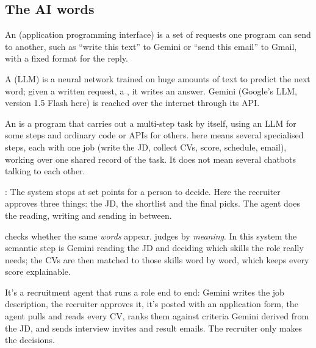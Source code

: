 \subsection*{The AI words}

\begin{definition}[API]
An  (application programming interface) is a set of requests one program can send to another, such as ``write this text'' to Gemini or ``send this email'' to Gmail, with a fixed format for the reply.
\end{definition}

\begin{definition}
A  (LLM) is a neural network trained on huge amounts of text to predict the next word; given a written request, a , it writes an answer. Gemini (Google's LLM, version 1.5 Flash here) is reached over the internet through its API.
\end{definition}

\begin{definition}
An  is a program that carries out a multi-step task by itself, using an LLM for some steps and ordinary code or APIs for others.  here means several specialised steps, each with one job (write the JD, collect CVs, score, schedule, email), working over one shared record of the task. It does not mean several chatbots talking to each other.
\end{definition}

\begin{definition}
: The system stops at set points for a person to decide. Here the recruiter approves three things: the JD, the shortlist and the final picks. The agent does the reading, writing and sending in between.
\end{definition}

\begin{definition}
 checks whether the same \emph{words} appear.  judges by \emph{meaning}. In this system the semantic step is Gemini reading the JD and deciding which skills the role really needs; the CVs are then matched to those skills word by word, which keeps every score explainable.
\end{definition}

\begin{sayit}
It's a recruitment agent that runs a role end to end: Gemini writes the job description, the recruiter approves it, it's posted with an application form, the agent pulls and reads every CV, ranks them against criteria Gemini derived from the JD, and sends interview invites and result emails. The recruiter only makes the decisions.
\end{sayit}

